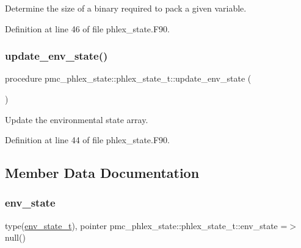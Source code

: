 Determine the size of a binary required to pack a given variable. 



Definition at line 46 of file phlex\+\_\+state.\+F90.

\mbox{\label{structpmc__phlex__state_1_1phlex__state__t_abb56d00f128933e322c042df3d905b13}} 
\subsubsection{\texorpdfstring{update\+\_\+env\+\_\+state()}{update\_env\_state()}}
{\footnotesize\ttfamily procedure pmc\+\_\+phlex\+\_\+state\+::phlex\+\_\+state\+\_\+t\+::update\+\_\+env\+\_\+state (\begin{DoxyParamCaption}{ }\end{DoxyParamCaption})\hspace{0.3cm}{\ttfamily [private]}}



Update the environmental state array. 



Definition at line 44 of file phlex\+\_\+state.\+F90.



\subsection{Member Data Documentation}
\mbox{\label{structpmc__phlex__state_1_1phlex__state__t_a4ac7b2d748d2da9249ced5e88637c302}} 
\subsubsection{\texorpdfstring{env\+\_\+state}{env\_state}}
{\footnotesize\ttfamily type(\mbox{\hyperlink{structpmc__env__state_1_1env__state__t}{env\+\_\+state\+\_\+t}}), pointer pmc\+\_\+phlex\+\_\+state\+::phlex\+\_\+state\+\_\+t\+::env\+\_\+state =$>$ null()\hspace{0.3cm}{\ttfamily [private]}}



